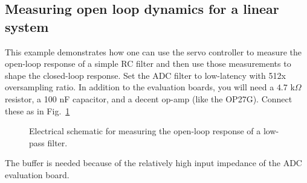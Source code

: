 \documentclass{article}
\begin{document}
\subsection{Measuring open loop dynamics for a linear system}
\label{ssec:openLoopLinear}
This example demonstrates how one can use the servo controller to measure the open-loop response of a simple RC filter and then use those measurements to shape the closed-loop response.  Set the ADC filter to low-latency with 512x oversampling ratio.  In addition to the evaluation boards, you will need a $4.7$ k$\Omega$ resistor, a 100 nF capacitor, and a decent op-amp (like the OP27G).  Connect these as in Fig.~\ref{fg:openLoopSchematic}
\begin{figure}[htbp]
	\centering
	\caption{Electrical schematic for measuring the open-loop response of a low-pass filter.}
	\label{fg:openLoopSchematic}
\end{figure}
The buffer is needed because of the relatively high input impedance of the ADC evaluation board.  
\end{document}

